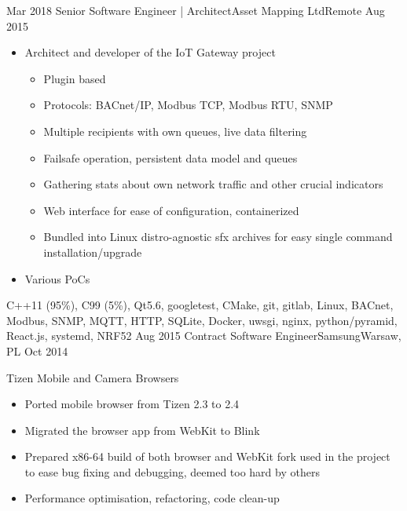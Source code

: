 \begin{experiences}
    {Mar 2018}     {Senior Software Engineer | Architect}{Asset Mapping Ltd}{Remote}
    {Aug 2015}    {
                      \begin{itemize}
                        \item Architect and developer of the IoT Gateway project
                        \begin{itemize}
                          \item Plugin based
                          \item Protocols: BACnet/IP, Modbus TCP, Modbus RTU, SNMP
                          \item Multiple recipients with own queues, live data filtering
                          \item Failsafe operation, persistent data model and queues                                                      
                          \item Gathering stats about own network traffic and other crucial indicators
                          \item Web interface for ease of configuration, containerized
                          \item Bundled into Linux distro-agnostic sfx archives for easy single command installation/upgrade
                        \end{itemize}
                        \item Various PoCs
                      \end{itemize}
                    }
                    {C++11 (95\%), C99 (5\%), Qt5.6, googletest, CMake, git, gitlab, Linux, BACnet, Modbus, SNMP, MQTT, HTTP, SQLite, Docker, uwsgi, nginx, python/pyramid, React.js, systemd, NRF52}
  \emptySeparator
  \experience
  {Aug 2015}       {Contract Software Engineer}{Samsung}{Warsaw, PL}
  {Oct 2014}       {
                      Tizen Mobile and Camera Browsers
                      \begin{itemize}
                        \item Ported mobile browser from Tizen 2.3 to 2.4
                        \item Migrated the browser app from WebKit to Blink
                        \item Prepared x86-64 build of both browser and WebKit fork used in the project to ease bug fixing and debugging, deemed too hard by others
                        \item Performance optimisation, refactoring, code clean-up

\end{itemize}}
\end{experiences}
